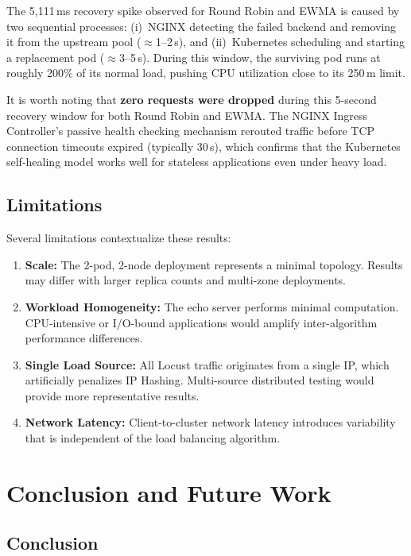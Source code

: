 \documentclass[conference]{IEEEtran}
\begin{document}
The 5,111\,ms recovery spike observed for Round Robin and EWMA is caused by two sequential processes: (i)~NGINX detecting the failed backend and removing it from the upstream pool ($\approx$1--2\,s), and (ii)~Kubernetes scheduling and starting a replacement pod ($\approx$3--5\,s). During this window, the surviving pod runs at roughly 200\% of its normal load, pushing CPU utilization close to its 250\,m limit.

It is worth noting that \textbf{zero requests were dropped} during this 5-second recovery window for both Round Robin and EWMA. The NGINX Ingress Controller's passive health checking mechanism rerouted traffic before TCP connection timeouts expired (typically 30\,s), which confirms that the Kubernetes self-healing model works well for stateless applications even under heavy load.

\subsection{Limitations}

Several limitations contextualize these results:
\begin{enumerate}
    \item \textbf{Scale:} The 2-pod, 2-node deployment represents a minimal topology. Results may differ with larger replica counts and multi-zone deployments.
    \item \textbf{Workload Homogeneity:} The echo server performs minimal computation. CPU-intensive or I/O-bound applications would amplify inter-algorithm performance differences.
    \item \textbf{Single Load Source:} All Locust traffic originates from a single IP, which artificially penalizes IP Hashing. Multi-source distributed testing would provide more representative results.
    \item \textbf{Network Latency:} Client-to-cluster network latency introduces variability that is independent of the load balancing algorithm.
\end{enumerate}


\section{Conclusion and Future Work}

\subsection{Conclusion}
\end{document}
